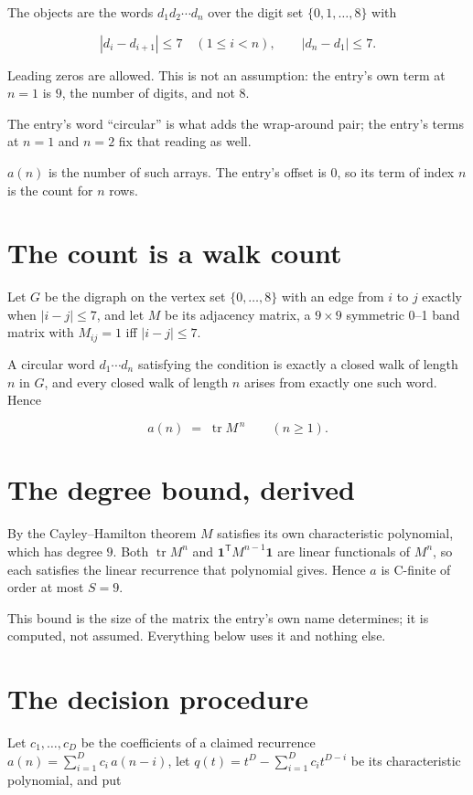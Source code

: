 \documentclass[11pt]{article}
\theoremstyle{definition}
\begin{document}
The objects are the words $d_1 d_2 \cdots d_n$ over the digit set $\{0,1,\dots,8\}$ with

\[|d_i - d_{i+1}| \le 7\quad (1 \le i < n), \qquad |d_n - d_1| \le 7.\]

Leading zeros are allowed. This is not an assumption: the entry's own term at $n=1$ is $9$, the number of digits, and not $8$.

The entry's word ``circular'' is what adds the wrap-around pair; the entry's terms at $n = 1$ and $n = 2$ fix that reading as well.

$a(n)$ is the number of such arrays. The entry's offset is 0, so its term of index $n$ is the count for $n$ rows.

\section{The count is a walk count}

Let $G$ be the digraph on the vertex set $\{0,\dots,8\}$ with an edge from $i$ to $j$ exactly when $|i-j| \le 7$, and let $M$ be its adjacency matrix, a $9 \times 9$ symmetric 0--1 band matrix with $M_{ij} = 1$ iff $|i-j| \le 7$.

A circular word $d_1\cdots d_n$ satisfying the condition is exactly a closed walk of length $n$ in $G$, and every closed walk of length $n$ arises from exactly one such word. Hence

\[a(n) \;=\; \operatorname{tr} M^{\,n} \qquad (n \ge 1).\]

\section{The degree bound, derived}

By the Cayley--Hamilton theorem $M$ satisfies its own characteristic polynomial, which has degree $9$. Both $\operatorname{tr} M^n$ and $\mathbf 1^{\mathsf T} M^{n-1} \mathbf 1$ are linear functionals of $M^{n}$, so each satisfies the linear recurrence that polynomial gives. Hence $a$ is C-finite of order at most $S = 9$.

This bound is the size of the matrix the entry's own name determines; it is computed, not assumed. Everything below uses it and nothing else.

\section{The decision procedure}

Let $c_1,\dots,c_D$ be the coefficients of a claimed recurrence $a(n) = \sum_{i=1}^{D} c_i\,a(n-i)$, let $q(t) = t^{D} - \sum_{i=1}^{D} c_i t^{D-i}$ be its characteristic polynomial, and put
\end{document}
